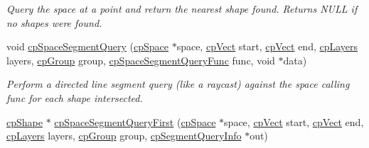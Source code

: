 \begin{DoxyCompactItemize}
\begin{DoxyCompactList}\small\item\em Query the space at a point and return the nearest shape found. Returns N\-U\-L\-L if no shapes were found. \end{DoxyCompactList}\item 
\hypertarget{group__cp_space_ga26da8e0202d712d7bc3714332aff0ea6}{void \hyperlink{group__cp_space_ga26da8e0202d712d7bc3714332aff0ea6}{cp\-Space\-Segment\-Query} (\hyperlink{structcp_space}{cp\-Space} $\ast$space, \hyperlink{structcp_vect}{cp\-Vect} start, \hyperlink{structcp_vect}{cp\-Vect} end, \hyperlink{group__basic_types_ga5ec31e87ed3973cab80f9bfbbbcb43bb}{cp\-Layers} layers, \hyperlink{group__basic_types_gacd811b1135a8f4a3e5cc019552b18b1a}{cp\-Group} group, \hyperlink{group__cp_space_gad48eefc60cdccc027c68b1f696e75838}{cp\-Space\-Segment\-Query\-Func} func, void $\ast$data)}\label{group__cp_space_ga26da8e0202d712d7bc3714332aff0ea6}

\begin{DoxyCompactList}\small\item\em Perform a directed line segment query (like a raycast) against the space calling {\ttfamily func} for each shape intersected. \end{DoxyCompactList}\item 
\hypertarget{group__cp_space_ga16901aee37e8830fe3900275a6a724aa}{\hyperlink{structcp_shape}{cp\-Shape} $\ast$ \hyperlink{group__cp_space_ga16901aee37e8830fe3900275a6a724aa}{cp\-Space\-Segment\-Query\-First} (\hyperlink{structcp_space}{cp\-Space} $\ast$space, \hyperlink{structcp_vect}{cp\-Vect} start, \hyperlink{structcp_vect}{cp\-Vect} end, \hyperlink{group__basic_types_ga5ec31e87ed3973cab80f9bfbbbcb43bb}{cp\-Layers} layers, \hyperlink{group__basic_types_gacd811b1135a8f4a3e5cc019552b18b1a}{cp\-Group} group, \hyperlink{structcp_segment_query_info}{cp\-Segment\-Query\-Info} $\ast$out)}\label{group__cp_space_ga16901aee37e8830fe3900275a6a724aa}


\end{DoxyCompactItemize}
